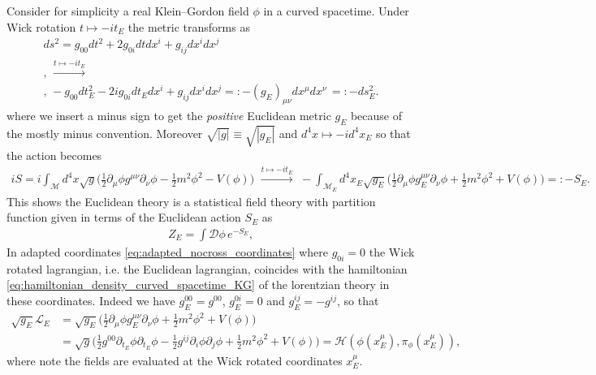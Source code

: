 \documentclass[../QFT_main.tex]{subfiles}
\begin{document}
\begin{mytheorem}
%
Consider for simplicity a real Klein--Gordon field $\phi$ in a curved spacetime.
Under Wick rotation $t\mapsto -it_E$ the metric transforms as
{\small\begin{align}\label{eq:wick_rotation_metric}
    ds^2 = g_{00} dt^2 + 2 g_{0i} dt dx^i + g_{ij} dx^i dx^j \\,\, \xrightarrow{t\mapsto -it_E}\\,\, -g_{00} dt_E^2 - 2 i g_{0i} dt_E dx^i + g_{ij} dx^i dx^j =:-(g_E)_{\mu\nu} dx^\mu dx^\nu\,=: -ds_E^2.
\end{align}}
where we insert a minus sign to get the \emph{positive} Euclidean metric $g_E$ because of the mostly minus convention.
Moreover $\sqrt{|g|}\equiv \sqrt{|g_E|}$ and $d^4x\mapsto -i d^4x_E$ so that the action becomes
{\small\begin{align}
    iS=i\int_{\mathcal{M}}\!\!\!\!\!d^4x \sqrt{g} \Big(\tfrac12 \partial_\mu\phi g^{\mu\nu}\partial_\nu\phi - \tfrac12 m^2 \phi^2-V(\phi) \Big)\,\,\xrightarrow{t\mapsto -it_E}\,\, -\int_{\mathcal{M}_E}\!\!\!\!\!\!d^4x_E \sqrt{g_E} \Big(\tfrac12 \partial_\mu\phi g_E^{\mu\nu}\partial_\nu\phi + \tfrac12 m^2 \phi^2+V(\phi) \Big)=: -S_E.
\end{align}}
This shows the Euclidean theory is a statistical field theory with partition function given in terms of the Euclidean action $S_E$ as
\begin{align}
    Z_E = \int \mathcal{D}\phi\, e^{-S_E},
\end{align}
In adapted coordinates \eqref{eq:adapted_nocross_coordinates} where $g_{0i}=0$ the Wick rotated lagrangian, i.e. the Euclidean lagrangian, coincides with the hamiltonian \eqref{eq:hamiltonian_density_curved_spacetime_KG} of the lorentzian theory in these coordinates.
Indeed we have $g_E^{00}=g^{00}$, $g_E^{0i}=0$ and $g_E^{ij}=-g^{ij}$, so that 
{\small\begin{align}
    \sqrt{g_E}\mathcal{L}_E&= \sqrt{g_E} \Big(\tfrac12 \partial_\mu\phi g_E^{\mu\nu}\partial_\nu\phi + \tfrac12 m^2 \phi^2+V(\phi) \Big) \\
    &= \sqrt{g} \Big(\tfrac12 g^{00}\partial_{t_E}\phi\partial_{t_E}\phi-\tfrac12 g^{ij}\partial_i\phi\partial_j\phi + \tfrac12 m^2 \phi^2+V(\phi) \Big) = \mathcal{H}(\phi(x_E^\mu),\pi_\phi(x_E^\mu)),
\end{align}}
where note the fields are evaluated at the Wick rotated coordinates $x_E^\mu$.


\end{mytheorem}
\end{document}

